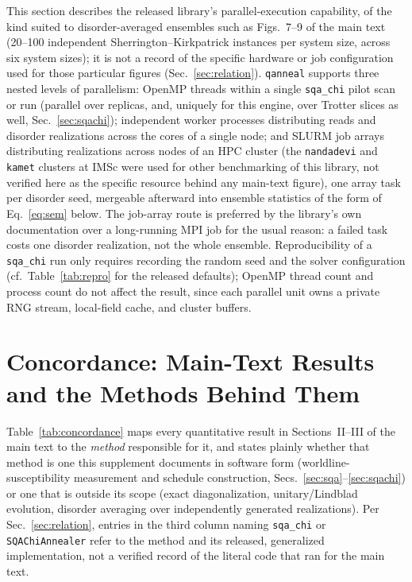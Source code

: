 \documentclass[11pt]{article}
\begin{document}
This section describes the released library's parallel-execution capability, of the kind suited to
disorder-averaged ensembles such as Figs.~7--9 of the main text (20--100 independent
Sherrington--Kirkpatrick instances per system size, across six system sizes); it is not a record of
the specific hardware or job configuration used for those particular figures (Sec.~\ref{sec:relation}).
\texttt{qanneal} supports three nested levels of parallelism: OpenMP threads within a single
\texttt{sqa\_chi} pilot scan or run (parallel over replicas, and, uniquely for this engine, over
Trotter slices as well, Sec.~\ref{sec:sqachi}); independent worker processes distributing reads and
disorder realizations across the cores of a single node; and SLURM job arrays distributing
realizations across nodes of an HPC cluster (the \texttt{nandadevi} and \texttt{kamet} clusters at
IMSc were used for other benchmarking of this library, not verified here as the specific resource
behind any main-text figure), one array task per disorder seed, mergeable afterward into ensemble
statistics of the form of Eq.~\eqref{eq:sem} below. The job-array route is preferred by the library's
own documentation over a long-running MPI job for the usual reason: a failed task costs one disorder
realization, not the whole ensemble. Reproducibility of a \texttt{sqa\_chi} run only requires
recording the random seed and the solver configuration (cf.\ Table~\ref{tab:repro} for the released
defaults); OpenMP thread count and process count do not affect the result, since each parallel unit
owns a private RNG stream, local-field cache, and cluster buffers.

\section{Concordance: Main-Text Results and the Methods Behind Them}
\label{sec:concordance}

Table~\ref{tab:concordance} maps every quantitative result in Sections~II--III of the main text to
the \emph{method} responsible for it, and states plainly whether that method is one this
supplement documents in software form (worldline-susceptibility measurement and schedule
construction, Secs.~\ref{sec:sqa}--\ref{sec:sqachi}) or one that is outside its scope (exact
diagonalization, unitary/Lindblad evolution, disorder averaging over independently generated
realizations). Per Sec.~\ref{sec:relation}, entries in the third column naming \texttt{sqa\_chi}
or \texttt{SQAChiAnnealer} refer to the method and its released, generalized implementation, not a
verified record of the literal code that ran for the main text.
\end{document}
